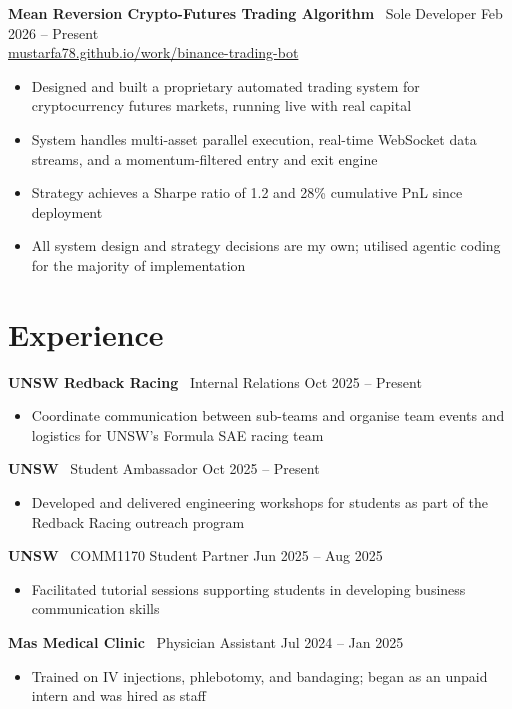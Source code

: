 \documentclass[11pt, a4paper]{article}
\newcommand{\role}[3]{%
  \textbf{#1} \textemdash\ #2 \hfill \textcolor{muted}{\small #3}%
}
\begin{document}
\role{Mean Reversion Crypto-Futures Trading Algorithm}{Sole Developer}{Feb 2026 -- Present}\\
{\small\color{link}\href{https://mustarfa78.github.io/work/binance-trading-bot}{mustarfa78.github.io/work/binance-trading-bot}}
\begin{itemize}
  \item Designed and built a proprietary automated trading system for cryptocurrency futures markets, running live with real capital
  \item System handles multi-asset parallel execution, real-time WebSocket data streams, and a momentum-filtered entry and exit engine
  \item Strategy achieves a Sharpe ratio of 1.2 and 28\% cumulative PnL since deployment
  \item All system design and strategy decisions are my own; utilised agentic coding for the majority of implementation
\end{itemize}

\section{Experience}

\role{UNSW Redback Racing}{Internal Relations}{Oct 2025 -- Present}
\begin{itemize}
  \item Coordinate communication between sub-teams and organise team events and logistics for UNSW's Formula SAE racing team
\end{itemize}

\medskip
\role{UNSW}{Student Ambassador}{Oct 2025 -- Present}
\begin{itemize}
  \item Developed and delivered engineering workshops for students as part of the Redback Racing outreach program
\end{itemize}

\medskip
\role{UNSW}{COMM1170 Student Partner}{Jun 2025 -- Aug 2025}
\begin{itemize}
  \item Facilitated tutorial sessions supporting students in developing business communication skills
\end{itemize}

\medskip
\role{Mas Medical Clinic}{Physician Assistant}{Jul 2024 -- Jan 2025}
\begin{itemize}
  \item Trained on IV injections, phlebotomy, and bandaging; began as an unpaid intern and was hired as staff
\end{itemize}
\end{document}
